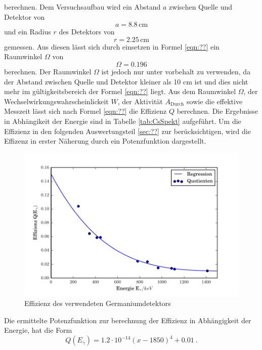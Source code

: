 berechnen. Dem Versuchsaufbau wird ein Abstand $a$ zwischen Quelle und Detektor von 
\begin{equation}
  a = 8.8 \, \text{cm}
  \label{<++>}
\end{equation}
und ein Radius $r$ des Detektors von
\begin{equation}
  r = 2.25 \, \text{cm} 
  \label{<++>}
\end{equation}
gemessen. Aus diesen lässt sich durch einsetzen in Formel \ref{eqn:??} ein Raumwinkel $\Omega$ von 
\begin{equation}
  \Omega = 0.196 
  \label{eqn:Raum}
\end{equation}
berechnen. Der Raumwinkel $\Omega$ ist jedoch nur unter vorbehalt zu verwenden, da der Abstand zwischen Quelle und Detektor kleiner als 10 cm ist und dies nicht mehr im gültigkeitsbereich der Formel \ref{eqn:??} liegt. Aus dem Raumwinkel $\Omega$, der Wechselwirkungswahrscheinlickeit $W$, der Aktivität $A_\text{Durch}$ sowie die effektive Messzeit lässt sich nach Formel \ref{eqn:??} die Effizienz $Q$ berechnen. Die Ergebnisse in Abhängikeit der Energie sind in Tabelle \ref{tab:CsSpekt} aufgeführt. Um die Effizienz in den folgenden Auswertungsteil \ref{sec:??} zur berücksichtigen, wird die Effizenz in erster Näherung durch ein Potenzfunktion dargestellt. 
\begin{figure}[H]
  \centering
  \includegraphics[width=\textwidth]{./build/Effizienz.pdf}
  \caption{Effizienz des verwendeten Germaniumdetektors}
  \label{fig:Efi}
\end{figure}
Die ermittelte Potenzfunktion zur berechnung der Effizienz in Abhängigkeit der Energie, hat die Form 
\begin{equation}
  Q(E_\gamma)= 1.2 \cdot 10^{-14} \left( x - 1850 \right)^4 + 0.01 \ .
  \label{eqn:QCs}
\end{equation}
